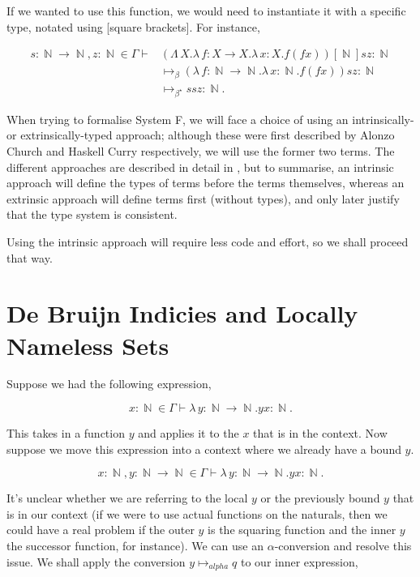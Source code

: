 \documentclass[logo,bsc,singlespacing,parskip,online]{infthesis}
\DeclareMathOperator{\nat}{\mathbb{N}}
\begin{document}
If we wanted to use this function, we would need to instantiate it with a specific type, notated using [square brackets]. For instance,

\begin{align*}
  s \colon \nat \to \nat, z \colon \nat \in \Gamma \vdash &(\Lambda \, X. \lambda \, f \colon X \to X . \lambda \, x \colon X . f (f x))[\nat] s z \colon \nat\\
  &\mapsto_{\beta} (\lambda \, f \colon \nat \to \nat . \lambda \, x \colon \nat . f (f x)) s z \colon \nat\\
  &\mapsto_{\beta^{\star}} s s z \colon \nat.
\end{align*}

When trying to formalise System F, we will face a choice of using an intrinsically- or extrinsically-typed approach; although these were first described by Alonzo Church and Haskell Curry respectively, we will use the former two terms. The different approaches are described in detail in \citet{gries_what_2003}, but to summarise, an intrinsic approach will define the types of terms before the terms themselves, whereas an extrinsic approach will define terms first (without types), and only later justify that the type system is consistent.

Using the intrinsic approach will require less code and effort, so we shall proceed that way.

\section{De Bruijn Indicies and Locally Nameless Sets}

Suppose we had the following expression,

\begin{equation*}
  x \colon \nat \in \Gamma \vdash \lambda \, y \colon \nat \to \nat. y x \colon \nat.
\end{equation*}

This takes in a function $y$ and applies it to the $x$ that is in the context. Now suppose we move this expression into a context where we already have a bound $y$.

\begin{equation*}
  x \colon \nat, y \colon \nat \to \nat \in \Gamma \vdash \lambda \, y \colon \nat \to \nat. y x \colon \nat.
\end{equation*}

It's unclear whether we are referring to the local $y$ or the previously bound $y$ that is in our context (if we were to use actual functions on the naturals, then we could have a real problem if the outer $y$ is the squaring function and the inner $y$ the successor function, for instance). We can use an $\alpha$-conversion and resolve this issue. We shall apply the conversion $y \mapsto_{alpha} q$ to our inner expression,
\end{document}
